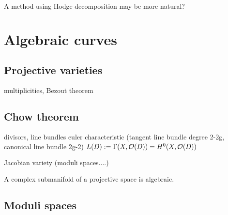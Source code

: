\documentclass{../../large}
\begin{document}
A method using Hodge decomposition may be more natural?







\chapter{Algebraic curves}

\section{Projective varieties}

multiplicities, Bezout theorem

\section{Chow theorem}
divisors, line bundles
euler characteristic
(tangent line bundle degree 2-2g, canonical line bundle 2g-2)
$L(D):=\Gamma(X,\mathcal{O}(D))=H^0(X,\mathcal{O}(D))$

Jacobian variety (moduli spaces....)


\begin{prb}
A complex submanifold of a projective space is algebraic.
\end{prb}


\section{Moduli spaces}
\end{document}
